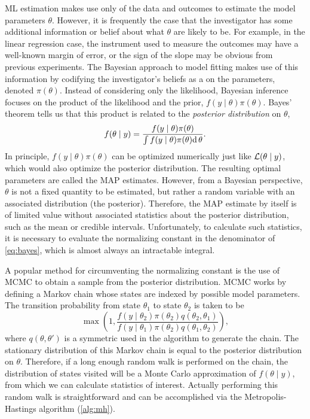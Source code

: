 \Gls{ML} estimation makes use only of the data and outcomes to estimate the
model parameters $\theta$. However, it is frequently the case that the
investigator has some additional information or belief about what $\theta$ are
likely to be. For example, in the linear regression case, the instrument used
to measure the outcomes may have a well-known margin of error, or the sign of
the slope may be obvious from previous experiments. The Bayesian approach to
model fitting makes use of this information by codifying the investigator's
beliefs as a  on the parameters, denoted
$\pi(\theta)$. Instead of considering only the likelihood, Bayesian inference
focuses on the product of the likelihood and the prior, $f(y \mid \theta)
\pi(\theta)$. Bayes' theorem tells us that this product is related to the
\textit{posterior distribution} on $\theta$,
\begin{align}
  f(\theta \mid y) 
    = \frac{f(y \mid \theta) \pi(\theta)}
           {\int f(y \mid \theta) \pi(\theta) \mathrm{d}\, \theta}.
  \label{eq:bayes}
\end{align}
In principle, $f(y \mid \theta) \pi(\theta)$ can be optimized numerically just
like $\mathcal{L}(\theta \mid y)$, which would also optimize the posterior distribution.
The resulting optimal parameters are called the \gls{MAP} estimates. However,
from a Bayesian perspective, $\theta$ is not a fixed quantity to be estimated,
but rather a random variable with an associated distribution (the posterior).
Therefore, the \gls{MAP} estimate by itself is of limited value without
associated statistics about the posterior distribution, such as the mean or
credible intervals. Unfortunately, to calculate such statistics, it is
necessary to evaluate the normalizing constant in the denominator of
\cref{eq:bayes}, which is almost always an intractable integral.

A popular method for circumventing the normalizing constant is the use of
\gls{MCMC} to obtain a sample from the posterior distribution. \Gls{MCMC} works
by defining a Markov chain whose states are indexed by possible model
parameters. The transition probability from state $\theta_1$ to state
$\theta_2$ is taken to be
\[
  \max\left(1, \frac{f(y \mid \theta_2) \pi(\theta_2) q(\theta_2, \theta_1)}
                    {f(y \mid \theta_1) \pi(\theta_2) q(\theta_1, \theta_2)} \right),
\]
where $q(\theta, \theta')$ is a symmetric  used in
the algorithm to generate the chain. The stationary distribution of this Markov
chain is equal to the posterior distribution on $\theta$. Therefore, if a long
enough random walk is performed on the chain, the distribution of states
visited will be a Monte Carlo approximation of $f(\theta \mid y)$, from
which we can calculate statistics of interest. Actually performing this random
walk is straightforward and can be accomplished via the Metropolis-Hastings
algorithm (\cref{alg:mh}).

